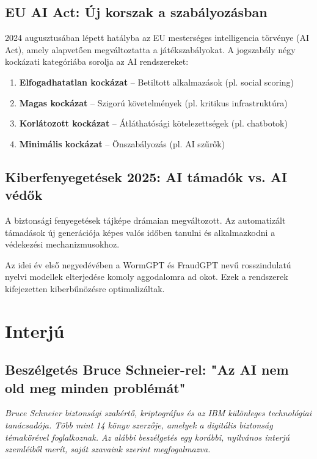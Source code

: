 \documentclass{../templates/magazine}
\begin{document}
\subsection{EU AI Act: Új korszak a szabályozásban}

2024 augusztusában lépett hatályba az EU mesterséges intelligencia törvénye (AI Act), amely alapvetően megváltoztatta a játékszabályokat. A jogszabály négy kockázati kategóriába sorolja az AI rendszereket:

\begin{enumerate}
    \item \textbf{Elfogadhatatlan kockázat} -- Betiltott alkalmazások (pl. social scoring)
    \item \textbf{Magas kockázat} -- Szigorú követelmények (pl. kritikus infrastruktúra)
    \item \textbf{Korlátozott kockázat} -- Átláthatósági kötelezettségek (pl. chatbotok)
    \item \textbf{Minimális kockázat} -- Önszabályozás (pl. AI szűrők)
\end{enumerate}

\subsection{Kiberfenyegetések 2025: AI támadók vs. AI védők}

A biztonsági fenyegetések tájképe drámaian megváltozott. Az automatizált támadások új generációja képes valós időben tanulni és alkalmazkodni a védekezési mechanizmusokhoz.

\begin{warningbox}[Figyelem!]
Az idei év első negyedévében a WormGPT és FraudGPT nevű rosszindulatú nyelvi modellek elterjedése komoly aggodalomra ad okot. Ezek a rendszerek kifejezetten kiberbűnözésre optimalizáltak.
\end{warningbox}

\newpage

\section{Interjú}

\subsection{Beszélgetés Bruce Schneier-rel: "Az AI nem old meg minden problémát"}

\textit{Bruce Schneier biztonsági szakértő, kriptográfus és az IBM különleges technológiai tanácsadója. Több mint 14 könyv szerzője, amelyek a digitális biztonság témakörével foglalkoznak. Az alábbi beszélgetés egy korábbi, nyilvános interjú szemléiből merít, saját szavaink szerint megfogalmazva.}
\end{document}
